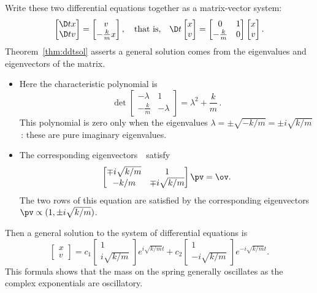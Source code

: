 \begin{example}
\begin{solution}
Write these two differential equations together as a matrix-vector system: 
\begin{equation*}
\begin{bmatrix} \D tx\\\D tv \end{bmatrix}
=\begin{bmatrix} v\\-\frac kmx \end{bmatrix},
\quad\text{that is,}\quad
\D t{}\begin{bmatrix} x\\v \end{bmatrix}
=\begin{bmatrix} 0&1\\-\frac km&0 \end{bmatrix}\begin{bmatrix} x\\v \end{bmatrix}.
\end{equation*}
Theorem~\ref{thm:ddtsol} asserts a general solution comes from the eigenvalues and eigenvectors of the matrix.
\begin{itemize}
\item Here the characteristic polynomial is
\begin{equation*}
\det\begin{bmatrix} -\lambda&1\\-\frac km&-\lambda \end{bmatrix}
=\lambda^2+\frac km\,.
\end{equation*}
This polynomial is zero only when the eigenvalues \(\lambda=\pm\sqrt{-k/m}=\pm i\sqrt{k/m}\)\,: these are pure imaginary eigenvalues.

\item  The corresponding eigenvectors~\pv\ satisfy
\begin{equation*}
\begin{bmatrix} \mp i\sqrt{k/m}&1\\- k/m&\mp i\sqrt{k/m} \end{bmatrix}
\pv=\ov.
\end{equation*}
The two rows of this equation are satisfied by the corresponding eigenvectors \(\pv\propto (1,\pm i\sqrt{k/m})\).
\end{itemize}
Then a general solution to the system of differential equations is
\begin{equation*}
\begin{bmatrix} x\\v \end{bmatrix}
=c_1\begin{bmatrix} 1\\i\sqrt{k/m} \end{bmatrix}e^{i\sqrt{k/m}t}
+c_2\begin{bmatrix} 1\\-i\sqrt{k/m} \end{bmatrix}e^{-i\sqrt{k/m}t}.
\end{equation*}
This formula shows that the mass on the spring generally oscillates as the complex exponentials are oscillatory.


\end{solution}
\end{example}
